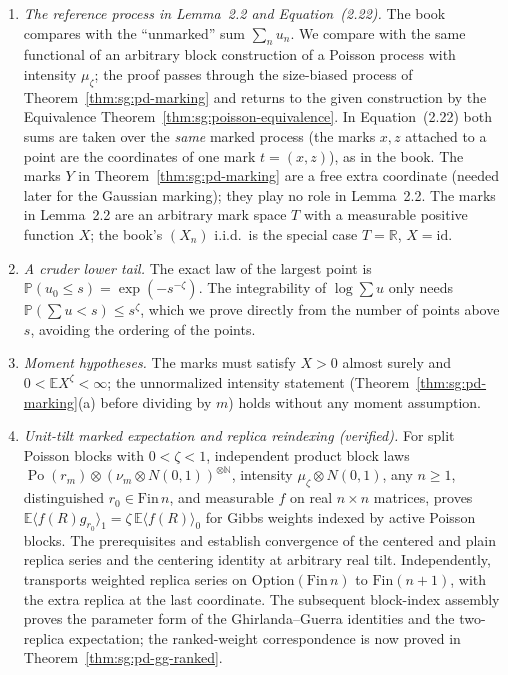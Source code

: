 \begin{remark}
\begin{enumerate}
\item \emph{The reference process in Lemma~2.2 and Equation~(2.22).} The book compares with the ``unmarked'' sum $\sum_nu_n$. We compare with the same functional of an arbitrary block construction of a Poisson process with intensity $\mu_\zeta$; the proof passes through the size-biased process of Theorem~\ref{thm:sg:pd-marking} and returns to the given construction by the Equivalence Theorem~\ref{thm:sg:poisson-equivalence}. In Equation~(2.22) both sums are taken over the \emph{same} marked process (the marks $x,z$ attached to a point are the coordinates of one mark $t=(x,z)$), as in the book. The marks $Y$ in Theorem~\ref{thm:sg:pd-marking} are a free extra coordinate (needed later for the Gaussian marking); they play no role in Lemma~2.2. The marks in Lemma~2.2 are an arbitrary mark space $T$ with a measurable positive function $X$; the book's $(X_n)$ i.i.d.\ is the special case $T=\mathbb R$, $X=\mathrm{id}$.
\item \emph{A cruder lower tail.} The exact law of the largest point is $\mathbb P(u_0\le s)=\exp(-s^{-\zeta})$. The integrability of $\log\sum u$ only needs $\mathbb P(\sum u<s)\le s^{\zeta}$, which we prove directly from the number of points above $s$, avoiding the ordering of the points.
\item \emph{Moment hypotheses.} The marks must satisfy $X>0$ almost surely and $0<\mathbb EX^\zeta<\infty$; the unnormalized intensity statement (Theorem~\ref{thm:sg:pd-marking}(a) before dividing by $m$) holds without any moment assumption.
\item \emph{Unit-tilt marked expectation and replica reindexing (verified).} For split Poisson blocks with $0<\zeta<1$, independent product block laws $\operatorname{Po}(r_m)\otimes(\nu_m\otimes N(0,1))^{\otimes\mathbb N}$, intensity $\mu_\zeta\otimes N(0,1)$, any $n\geq1$, distinguished $r_0\in\mathrm{Fin}\,n$, and measurable $f$ on real $n\times n$ matrices,  proves $\mathbb E\langle f(R)g_{r_0}\rangle_1=\zeta\,\mathbb E\langle f(R)\rangle_0$ for Gibbs weights indexed by active Poisson blocks. The prerequisites  and  establish convergence of the centered and plain replica series and the centering identity at arbitrary real tilt. Independently,  transports weighted replica series on $\mathrm{Option}(\mathrm{Fin}\,n)$ to $\mathrm{Fin}(n+1)$, with the extra replica at the last coordinate. The subsequent block-index assembly proves the parameter form of the Ghirlanda--Guerra identities and the two-replica expectation; the ranked-weight correspondence is now proved in Theorem~\ref{thm:sg:pd-gg-ranked}.

\end{enumerate}
\end{remark}
